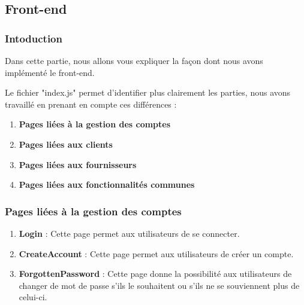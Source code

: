 \subsection{Front-end}
\subsubsection{Intoduction}
\begin{flushleft}
Dans cette partie, nous allons vous expliquer la façon dont nous avons implémenté le front-end.
\end{flushleft}
\begin{flushleft}
Le fichier "index.js" permet d'identifier plus clairement les parties, nous avons travaillé en prenant en compte ces différences : 
\end{flushleft}
\begin{enumerate}[-]
\item \textbf{Pages liées à la gestion des comptes}
\item \textbf{Pages liées aux clients}
\item \textbf{Pages liées aux fournisseurs}
\item \textbf{Pages liées aux fonctionnalités communes}
\end{enumerate} 
\newpage
\subsubsection{Pages liées à la gestion des comptes}
\begin{enumerate}
\item \textbf{Login} :\newline
Cette page permet aux utilisateurs de se connecter.
\item \textbf{CreateAccount} :\newline
Cette page permet aux utilisateurs de créer un compte.
\item \textbf{ForgottenPassword} :\newline
Cette page donne la possibilité aux utilisateurs de changer de mot de passe s'ils le souhaitent ou s'ils ne se souviennent plus de celui-ci.
\end{enumerate}

\newpage
